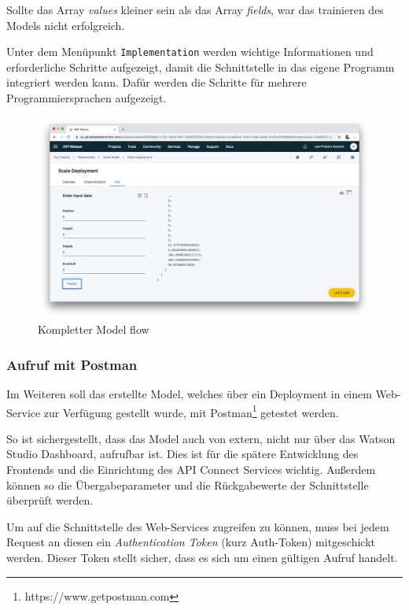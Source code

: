 Sollte das Array \textit{values} kleiner sein als das Array \textit{fields}, war das trainieren des Models nicht
erfolgreich.

Unter dem Menüpunkt \texttt{Implementation} werden wichtige Informationen und erforderliche Schritte aufgezeigt, damit
die Schnittstelle in das eigene Programm integriert werden kann. Dafür werden die Schritte für mehrere Programmiersprachen
aufgezeigt.

\begin{figure}[h]
    \centering
    \includegraphics[scale=0.26]{images/kapitel_3/deployment_test.png}
    \caption{Kompletter Model flow}
    \label{fig:umsetzung_deployment_test}
\end{figure}

\subsubsection{Aufruf mit Postman}
\label{subsec:Aufruf mit Postman}
Im Weiteren soll das erstellte Model, welches über ein Deployment in einem Web-Service zur Verfügung gestellt wurde,
mit Postman\footnote{https://www.getpostman.com} getestet werden.

So ist sichergestellt, dass das Model auch von extern, nicht nur über das Watson Studio Dashboard, aufrufbar ist.
Dies ist für die spätere Entwicklung des Frontends und die Einrichtung des API Connect Services wichtig. Außerdem können
so die Übergabeparameter und die Rückgabewerte der Schnittstelle überprüft werden.

Um auf die Schnittstelle des Web-Services zugreifen zu können, muss bei jedem Request an diesen ein
\textit{Authentication Token} (kurz Auth-Token) mitgeschickt werden. Dieser Token stellt sicher, dass es sich um einen
gültigen Aufruf handelt.

